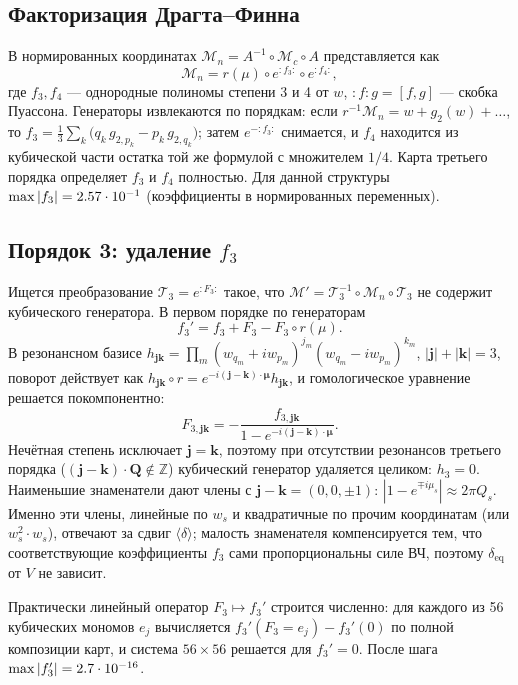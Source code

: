 \documentclass[a4paper,11pt]{article}
\newcommand{\deq}{\delta_{\mathrm{eq}}}
\begin{document}
\subsection{Факторизация Драгта--Финна}
В нормированных координатах $\mathcal M_n=A^{-1}\circ\mathcal M_c\circ A$ представляется как
\[
\mathcal M_n=r(\mu)\circ e^{:f_3:}\circ e^{:f_4:},
\]
где $f_3,f_4$ --- однородные полиномы степени 3 и 4 от $w$, $:f:g=[f,g]$ --- скобка Пуассона. Генераторы извлекаются по порядкам: если $r^{-1}\mathcal M_n=w+g_2(w)+\dots$, то $f_3=\frac13\sum_k\bigl(q_k\,g_{2,p_k}-p_k\,g_{2,q_k}\bigr)$; затем $e^{-:f_3:}$ снимается, и $f_4$ находится из кубической части остатка той же формулой с множителем $1/4$. Карта третьего порядка определяет $f_3$ и $f_4$ полностью. Для данной структуры $\max|f_3|=2.57\cdot10^{-1}$ (коэффициенты в нормированных переменных).

\subsection{Порядок 3: удаление $f_3$}
Ищется преобразование $\mathcal T_3=e^{:F_3:}$ такое, что $\mathcal M'=\mathcal T_3^{-1}\circ\mathcal M_n\circ\mathcal T_3$ не содержит кубического генератора. В первом порядке по генераторам
\[
f_3'=f_3+F_3-F_3\circ r(\mu).
\]
В резонансном базисе $h_{\mathbf{jk}}=\prod_m(w_{q_m}+iw_{p_m})^{j_m}(w_{q_m}-iw_{p_m})^{k_m}$, $|\mathbf j|+|\mathbf k|=3$, поворот действует как $h_{\mathbf{jk}}\circ r=e^{-i(\mathbf j-\mathbf k)\cdot\boldsymbol\mu}h_{\mathbf{jk}}$, и гомологическое уравнение решается покомпонентно:
\[
F_{3,\mathbf{jk}}=-\frac{f_{3,\mathbf{jk}}}{1-e^{-i(\mathbf j-\mathbf k)\cdot\boldsymbol\mu}}.
\]
Нечётная степень исключает $\mathbf j=\mathbf k$, поэтому при отсутствии резонансов третьего порядка ($(\mathbf j-\mathbf k)\cdot\mathbf Q\notin\mathbb Z$) кубический генератор удаляется целиком: $h_3=0$. Наименьшие знаменатели дают члены с $\mathbf j-\mathbf k=(0,0,\pm1)$: $|1-e^{\mp i\mu_s}|\approx2\pi Q_s$. Именно эти члены, линейные по $w_s$ и квадратичные по прочим координатам (или $w_s^2\cdot w_s$), отвечают за сдвиг $\langle\delta\rangle$; малость знаменателя компенсируется тем, что соответствующие коэффициенты $f_3$ сами пропорциональны силе ВЧ, поэтому $\deq$ от $V$ не зависит.

Практически линейный оператор $F_3\mapsto f_3'$ строится численно: для каждого из 56 кубических мономов $e_j$ вычисляется $f_3'(F_3=e_j)-f_3'(0)$ по полной композиции карт, и система $56\times56$ решается для $f_3'=0$. После шага $\max|f_3'|=2.7\cdot10^{-16}$.
\end{document}
